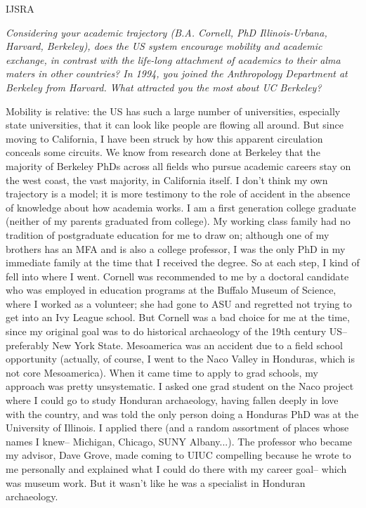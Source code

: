 \begin{labeling}{IJSRA}
\item[IJSRA] \textit{Considering your academic trajectory (B.A. Cornell, PhD Illinois-Urbana, Harvard, Berkeley), does the US system encourage mobility and academic exchange, in contrast with the life-long attachment of academics to their alma maters in other countries? In 1994, you joined the Anthropology Department at Berkeley from Harvard. What attracted you the most about UC Berkeley?}

\item[RAJ] Mobility is relative: the US has such a large number of universities, especially state universities, that it can look like people are flowing all around. But since moving to California, I have been struck by how this apparent circulation conceals some circuits. We know from research done at Berkeley that the majority of Berkeley PhDs across all fields who pursue academic careers stay on the west coast, the vast majority, in California itself. I don't think my own trajectory is a model; it is more testimony to the role of accident in the absence of knowledge about how academia works. I am a first generation college graduate (neither of my parents graduated from college). My working class family had no tradition of postgraduate education for me to draw on; although one of my brothers has an MFA and is also a college professor, I was the only PhD in my immediate family at the time that I received the degree. So at each step, I kind of fell into where I went. Cornell was recommended to me by a doctoral candidate who was employed in education programs at the Buffalo Museum of Science, where I worked as a volunteer; she had gone to ASU and regretted not trying to get into an Ivy League school. But Cornell was a bad choice for me at the time, since my original goal was to do historical archaeology of the 19th century US-- preferably New York State. Mesoamerica was an accident due to a field school opportunity (actually, of course, I went to the Naco Valley in Honduras, which is not core Mesoamerica). When it came time to apply to grad schools, my approach was pretty unsystematic. I asked one grad student on the Naco project where I could go to study Honduran archaeology, having fallen deeply in love with the country, and was told the only person doing a Honduras PhD was at the University of Illinois. I applied there (and a random assortment of places whose names I knew-- Michigan, Chicago, SUNY Albany...). The professor who became my advisor, Dave Grove, made coming to UIUC compelling because he wrote to me personally and explained what I could do there with my career goal-- which was museum work. But it wasn't like he was a specialist in Honduran archaeology.


\end{labeling}
